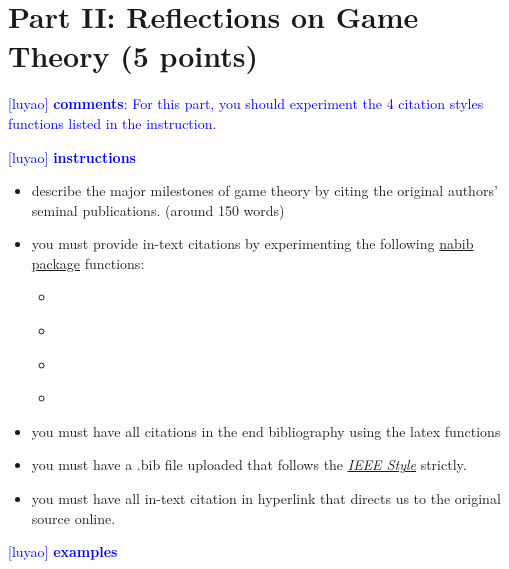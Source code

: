 \documentclass[runningheads]{llncs}
\newcommand{\luyao}[1]{\textcolor{blue}{[luyao] #1}}
\newcommand{\luyao}[1]{}
\begin{document}
\section{Part II: Reflections on Game Theory (5 points)}
\luyao{\textbf{comments}: For this part, you should experiment the 4 citation styles functions listed in the instruction.}

\noindent\luyao{\textbf{instructions}}
\begin{itemize}
    \item describe the major milestones of game theory by citing the original authors' seminal publications. (around 150 words)
    \item you must provide in-text citations by experimenting the following \href{https://tex.stackexchange.com/questions/202963/how-to-cite-author-in-ieee-format}{nabib package} functions:
    \begin{itemize}
        \item \cite{neumann_1947_theory}
        \item \citet{neumann_1947_theory}
        \item \citeauthor{neumann_1947_theory}
        \item \citeyear{neumann_1947_theory}
    \end{itemize}
    \item you must have all citations in the end bibliography using the latex functions
    \item you must have a .bib file uploaded that follows the \href{https://www.chicagomanualofstyle.org/tools_citationguide/citation-guide-2.html}{\textit{\underline{IEEE Style}}} strictly. 
    \item you must have all in-text citation in hyperlink that directs us to the original source online. 
\end{itemize}

\newpage
\luyao{\textbf{examples}}
\end{document}
